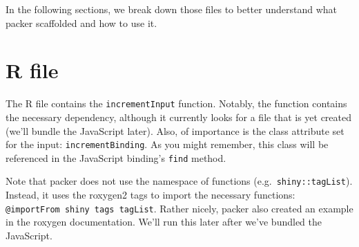 \documentclass[
]{krantz}
\makeatletter
\newenvironment{Shaded}{\begin{snugshade}}{\end{snugshade}}
\newcommand{\ControlFlowTok}[1]{\textcolor[rgb]{0.27,0.27,0.27}{\textbf{#1}}}
\newcommand{\DataTypeTok}[1]{\textcolor[rgb]{0.27,0.27,0.27}{#1}}
\newcommand{\DecValTok}[1]{\textcolor[rgb]{0.06,0.06,0.06}{#1}}
\newcommand{\KeywordTok}[1]{\textcolor[rgb]{0.27,0.27,0.27}{\textbf{#1}}}
\newcommand{\NormalTok}[1]{#1}
\newcommand{\OperatorTok}[1]{\textcolor[rgb]{0.43,0.43,0.43}{\textbf{#1}}}
\newcommand{\StringTok}[1]{\textcolor[rgb]{0.5,0.5,0.5}{#1}}
\newenvironment{kframe}{%
\medskip{}
\setlength{\fboxsep}{.8em}
 \def\at@end@of@kframe{}%
 \ifinner\ifhmode%
  \def\at@end@of@kframe{\end{minipage}}%
  \begin{minipage}{\columnwidth}%
 \fi\fi%
 \def\FrameCommand##1{\hskip\@totalleftmargin \hskip-\fboxsep
 \colorbox{shadecolor}{##1}\hskip-\fboxsep
     \hskip-\linewidth \hskip-\@totalleftmargin \hskip\columnwidth}%
 \MakeFramed {\advance\hsize-\width
   \@totalleftmargin\z@ \linewidth\hsize
   \@setminipage}}%
 {\par\unskip\endMakeFramed%
 \at@end@of@kframe}
\renewenvironment{Shaded}{\begin{kframe}}{\end{kframe}}
\makeatother
\begin{document}
In the following sections, we break down those files to better understand what packer scaffolded and how to use it.

\hypertarget{packer-r-file}{%
\section{R file}\label{packer-r-file}}

The R file contains the \texttt{incrementInput} function. Notably, the function contains the necessary dependency, although it currently looks for a file that is yet created (we'll bundle the JavaScript later). Also, of importance is the class attribute set for the input: \texttt{incrementBinding}. As you might remember, this class will be referenced in the JavaScript binding's \texttt{find} method.

\begin{Shaded}
\end{Shaded}

Note that packer does not use the namespace of functions (e.g.~\texttt{shiny::tagList}). Instead, it uses the roxygen2 tags to import the necessary functions: \texttt{@importFrom\ shiny\ tags\ tagList}. Rather nicely, packer also created an example in the roxygen documentation. We'll run this later after we've bundled the JavaScript.
\end{document}
